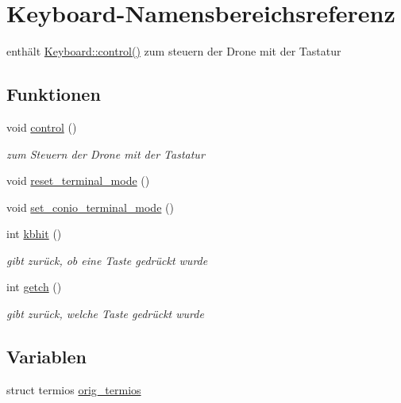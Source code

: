 \hypertarget{namespace_keyboard}{
\section{Keyboard-\/Namensbereichsreferenz}
\label{namespace_keyboard}
}


enthält \hyperlink{namespace_keyboard_abfb3168172d115a6516147c6d42f58db}{Keyboard::control()} zum steuern der Drone mit der Tastatur  


\subsection*{Funktionen}
\begin{DoxyCompactItemize}
\item 
void \hyperlink{namespace_keyboard_abfb3168172d115a6516147c6d42f58db}{control} ()
\begin{DoxyCompactList}\small\item\em zum Steuern der Drone mit der Tastatur \end{DoxyCompactList}\item 
void \hyperlink{namespace_keyboard_aef945e5d33422ac6abbb326b5203eb5b}{reset\_\-terminal\_\-mode} ()
\item 
void \hyperlink{namespace_keyboard_a6cc4fc3f7daf5630d0570f9d9d21d19c}{set\_\-conio\_\-terminal\_\-mode} ()
\item 
int \hyperlink{namespace_keyboard_a8c142c603571175e17a83a9b99d00d63}{kbhit} ()
\begin{DoxyCompactList}\small\item\em gibt zurück, ob eine Taste gedrückt wurde \end{DoxyCompactList}\item 
int \hyperlink{namespace_keyboard_a433fc58fb356fe62305e8419dd7b33d6}{getch} ()
\begin{DoxyCompactList}\small\item\em gibt zurück, welche Taste gedrückt wurde \end{DoxyCompactList}\end{DoxyCompactItemize}
\subsection*{Variablen}
\begin{DoxyCompactItemize}
\item 
struct termios \hyperlink{namespace_keyboard_a8b623d5192e406c97c4e265dbe4c5f38}{orig\_\-termios}
\end{DoxyCompactItemize}


